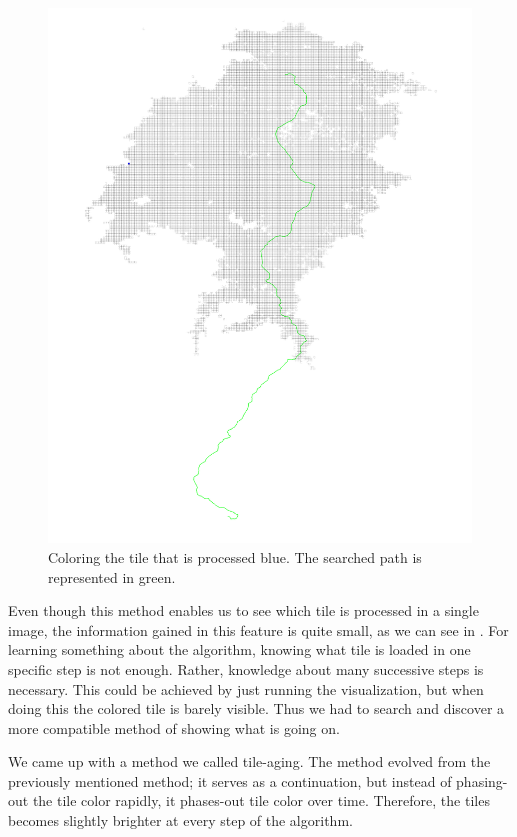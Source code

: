 \documentclass
[
    paper = a4,
    pagesize,
    12 pt,
    oneside,                       %
    open = right,
    DIV = calc,
    BCOR = 0 mm,                   %
    bibtotoc
]
{scrbook}
\begin{document}
\begin{figure}
        \includegraphics[width=\textwidth]{Images/vis-current-tile.png}
\caption[]{Coloring the tile that is processed blue. The searched path is represented in green.}
\label{fig:color_current_tile}
\end{figure}

Even though this method enables us to see which tile is processed in a single image, the information gained in this feature is quite small, as we can see in .
For learning something about the algorithm, knowing what tile is loaded in one specific step is not enough.
Rather, knowledge about many successive steps is necessary.
This could be achieved by just running the visualization, but when doing this the colored tile is barely visible.
Thus we had to search and discover a more compatible method of showing what is going on.

We came up with a method we called tile-aging.
The method evolved from the previously mentioned method; it serves as a continuation, but instead of phasing-out the tile color rapidly, it phases-out tile color over time.
Therefore, the tiles becomes slightly brighter at every step of the algorithm.
\end{document}
